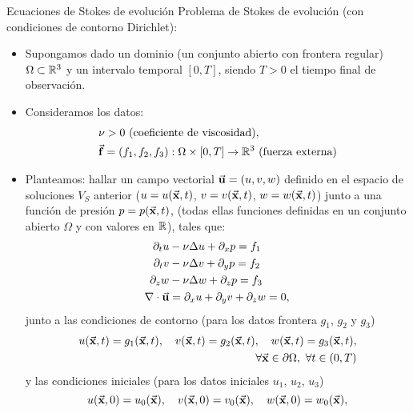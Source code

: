 \documentclass[9pt, dvipsnames,]{beamer}
\begin{document}
\begin{frame}{Ecuaciones de Stokes de evolución}
  \small
  \alert{Problema de Stokes de evolución} (con condiciones de contorno \alert{Dirichlet}):

  \begin{itemize}
  \item Supongamos dado un dominio (un conjunto abierto con frontera
    regular) $\Omega\subset {\mathbb R}^3$ y un intervalo temporal $[0,T]$,
    siendo $T>0$ el tiempo final de observación.
  \item Consideramos los datos:
    \begin{align}
      &\nu>0 \ \text{(coeficiente de viscosidad)},\\
      &\ff=(f_1,f_2,f_3):\Omega\times [0,T] \to \Rset^3 \ \text{(fuerza externa)}
    \end{align}

  \item Planteamos: hallar un campo vectorial $\vec{\mathbf{u}}=(u,v,w)$ definido
    en el espacio de soluciones $V_S$ anterior ($u=u(\vec{\mathbf{x}},t)$,
    $v=v(\vec{\mathbf{x}},t)$, $w=w(\vec{\mathbf{x}},t)$) junto a una función de presión $p=p(\vec{\mathbf{x}},t)$,
    (todas ellas funciones definidas en un conjunto abierto $\Omega$ y
    con valores en ${\mathbb R}$), tales que:
    \begin{align}
      \partial_t u &- \nu\Delta u + \partial_x p = f_1
      \\
      \partial_t v &- \nu\Delta v + \partial_y p = f_2
      \\
      \partial_z w &- \nu\Delta w + \partial_z p = f_3
      \\
      \nabla\cdot{}\vec{\mathbf{u}} &= \partial_x u + \partial_y v + \partial_z w = 0,
    \end{align}
    junto a las condiciones de contorno (para los datos frontera $g_1$, $g_2$ y $g_3$)
    \begin{align}
      u(\vec{\mathbf{x}},t)=g_1(\vec{\mathbf{x}},t),
      \quad
      v(\vec{\mathbf{x}},t)=g_2(\vec{\mathbf{x}},t),
      \quad
      w(\vec{\mathbf{x}},t)=g_3(\vec{\mathbf{x}},t),
      \\
    \forall \vec{\mathbf{x}}\in\partial\Omega, \ \forall t\in(0,T)
    \end{align}
    y las condiciones iniciales (para los datos iniciales $u_1$, $u_2$, $u_3$)
    $$
    u(\vec{\mathbf{x}},0) = u_0(\vec{\mathbf{x}}), \quad v(\vec{\mathbf{x}},0)=v_0(\vec{\mathbf{x}}), \quad w(\vec{\mathbf{x}},0)=w_0(\vec{\mathbf{x}}),
    $$
  \end{itemize}

\end{frame}
\end{document}
